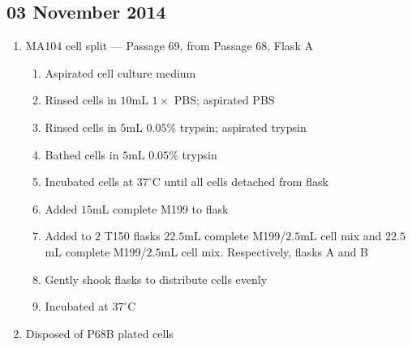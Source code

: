 
\subsection*{03 November 2014}

\begin{enumerate}
	\item MA104 cell split --- Passage 69, from Passage 68, Flask A
		\begin{enumerate}
			\item Aspirated cell culture medium
			\item Rinsed cells in $10$mL $1\times$ PBS; aspirated PBS
			\item Rinsed cells in $5$mL $0.05$\% trypsin; aspirated trypsin
			\item Bathed cells in $5$mL $0.05$\% trypsin
			\item Incubated cells at $37^{\circ}$C until all cells detached from flask
			\item Added $15$mL complete M199 to flask
			\item Added to $2$ T150 flasks $22.5$mL complete M199/$2.5$mL cell mix and $22.5$mL complete M199/$2.5$mL cell mix. Respectively, flasks A and B
			\item Gently shook flasks to distribute cells evenly
			\item Incubated at $37^{\circ}$C
		\end{enumerate}
	\item Disposed of P68B plated cells
\end{enumerate}